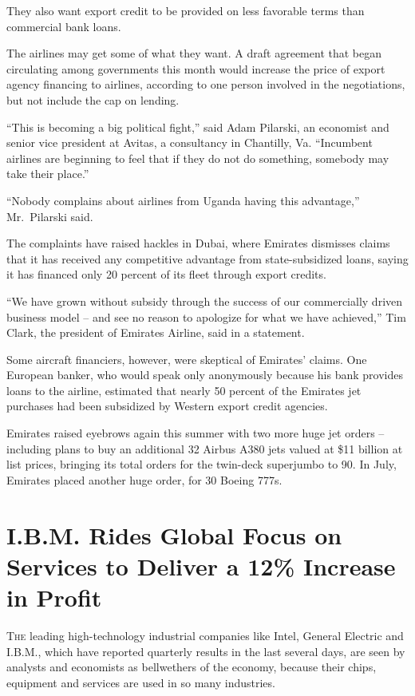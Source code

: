 ﻿\documentclass[12pt]{article}
\begin{document}
They also want export credit to be provided on less favorable terms than commercial bank loans.

The airlines may get some of what they want. A draft agreement that began circulating among
governments this month would increase the price of export agency financing to airlines, according to
one person involved in the negotiations, but not include the cap on lending.

``This is becoming a big political fight,'' said Adam Pilarski, an economist and senior vice
president at Avitas, a consultancy in Chantilly, Va. ``Incumbent airlines are beginning to feel that
if they do not do something, somebody may take their place.''

``Nobody complains about airlines from Uganda having this advantage,'' Mr.~Pilarski said.

The complaints have raised hackles in Dubai, where Emirates dismisses claims that it has received
any competitive advantage from state-subsidized loans, saying it has financed only 20 percent of its
fleet through export credits.

``We have grown without subsidy through the success of our commercially driven business model -- and
see no reason to apologize for what we have achieved,'' Tim Clark, the president of Emirates
Airline, said in a statement.

Some aircraft financiers, however, were skeptical of Emirates' claims. One European banker, who
would speak only anonymously because his bank provides loans to the airline, estimated that nearly
50 percent of the Emirates jet purchases had been subsidized by Western export credit agencies.

Emirates raised eyebrows again this summer with two more huge jet orders -- including plans to buy
an additional 32 Airbus A380 jets valued at \$11 billion at list prices, bringing its total orders
for the twin-deck superjumbo to 90. In July, Emirates placed another huge order, for 30 Boeing 777s.

\section{I.B.M. Rides Global Focus on Services to Deliver a 12\% Increase in Profit}

\lettrine{T}{he} leading high-technology industrial companies like Intel,
General Electric and I.B.M., which have reported quarterly results in the last several days, are
seen by analysts and economists as bellwethers of the economy, because their chips, equipment and
services are used in so many industries.
\end{document}
